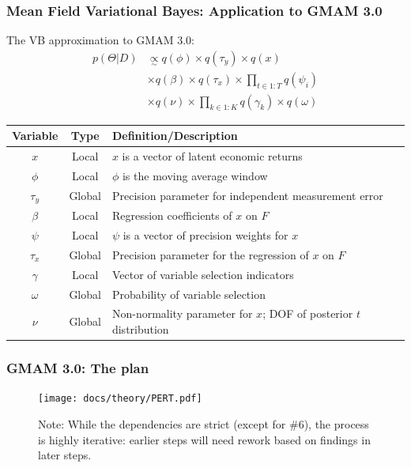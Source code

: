 \documentclass[10pt, compress]{beamer}
\begin{document}
\begin{frame}[fragile]
\frametitle{Mean Field Variational Bayes: Application to GMAM 3.0}

The VB approximation to GMAM 3.0:
\begin{align*}
    p\left(\Theta|D\right)&\underset{\sim}{\propto}q\left(\phi\right)\times q\left(\tau_{y}\right)\times q\left(x\right)\\
    &\times q\left(\beta\right)\times q\left(\tau_{x}\right)\times\prod_{t\in1:T}q\left(\psi_{i}\right)\\
    &\times q\left(\nu\right)\times\prod_{k\in1:K}q\left(\gamma_{k}\right)\times q\left(\omega\right)
\end{align*}

\begin{table}
\scriptsize

\vspace{-10pt}   
    \begin{tabular}{ccl}
    \toprule 
        Variable & Type & Definition/Description\tabularnewline
        \midrule
            $x$ & Local & $x$ is a vector of latent economic returns\tabularnewline
            $\phi$ & Local & $\phi$ is the moving average window\tabularnewline
            $\tau_{y}$ & Global & Precision parameter for independent measurement error\tabularnewline
            $\beta$ & Local & Regression coefficients of $x$ on $F$\tabularnewline
            $\psi$ & Local & $\psi$ is a vector of precision weights for $x$\tabularnewline
            $\tau_{x}$ & Global & Precision parameter for the regression of $x$ on $F$\tabularnewline
            $\gamma$ & Local & Vector of variable selection indicators\tabularnewline
            $\omega$ & Global & Probability of variable selection\tabularnewline
            $\nu$ & Global & Non-normality parameter for $x$; DOF of posterior $t$ distribution\tabularnewline
        \bottomrule
    \end{tabular}
\end{table}
\end{frame}



\begin{frame}[fragile]
\frametitle{GMAM 3.0: The plan}
\begin{figure}
	\centering
	\texttt{[image: docs/theory/PERT.pdf]}\\
    \bigskip
    \raggedright{
     Note: While the dependencies are strict (except for \#6), the process is highly iterative: earlier steps will need rework based on findings in later steps.}
\end{figure}
\end{frame}
\end{document}
